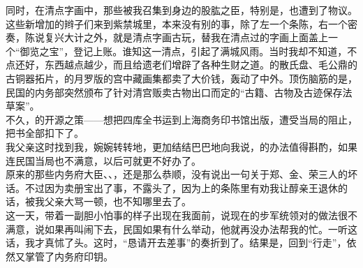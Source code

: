 同时，在清点字画中，那些被我召集到身边的股肱之臣，特别是，也遭到了物议。这些新增加的辫子们来到紫禁城里，本来没有别的事，除了左一个条陈，右一个密奏，陈说复兴大计之外，就是清点字画古玩，替我在清点过的字画上面盖上一个“御览之宝”，登记上账。谁知这一清点，引起了满城风雨。当时我却不知道，不点还好，东西越点越少，而且给遗老们增辟了各种生财之道。的散氏盘、毛公鼎的古铜器拓片，的月罗版的宫中藏画集都卖了大价钱，轰动了中外。顶伤脑筋的是，民国的内务部突然颁布了针对清宫贩卖古物出口而定的“古籍、古物及古迹保存法草案”。\\

不久，的开源之策——想把四库全书运到上海商务印书馆出版，遭受当局的阻止，把书全部扣下了。\\

我父亲这时找到我，婉婉转转地，更加结结巴巴地向我说，的办法值得斟酌，如果连民国当局也不满意，以后可就更不好办了。\\

原来的那些内务府大臣、、，还是那么恭顺，没有说出一句关于郑、金、荣三人的坏话。不过因为卖册宝出了事，不露头了，因为上的条陈里有劝我让醇亲王退休的话，被我父亲大骂一顿，也不知哪里去了。\\

这一天，带着一副胆小怕事的样子出现在我面前，说现在的步军统领对的做法很不满意，说如果再叫闹下去，民国如果有什么举动，他就再没办法帮我的忙。一听这话，我才真怵了头。这时，“恳请开去差事”的奏折到了。结果是，回到“行走”，依然又掌管了内务府印钥。
